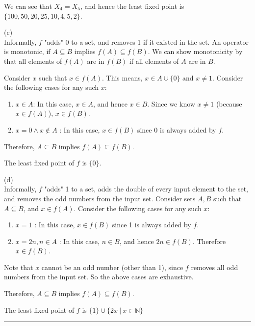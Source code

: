 \documentclass[12pt,letterpaper, onecolumn]{exam}
\begin{document}
\begin{questions}
	We can see that $X_4 = X_5$, and hence the least fixed point is $ \{100, 50, 20, 25, 10, 4, 5, 2\} $.

	(c) \\
	Informally, $f$ "adds" 0 to a set, and removes 1 if it existed in the set.
	An operator is monotonic, if $A \subseteq B$ implies $f(A) \subseteq f(B)$.
	We can show monotonicity by that all elements of $f(A)$ are in $f(B)$ if all elements of $A$ are in $B$.

	Consider $x$ such that $x \in f(A)$. This means, $x \in A \cup \{0\}$ and $x \neq 1$.
	Consider the following cases for any such $x$:
	\begin{enumerate}
		\item $x \in A $: In this case, $x \in A$, and hence $x \in B$. Since we know $x \neq 1$ (because $x \in f(A)$), $x \in f(B)$.
		\item $x = 0 \land x \notin A$ : In this case, $x \in f(B)$ since 0 is always added by $f$.
	\end{enumerate}

	Therefore, $A \subseteq B$ implies $f(A) \subseteq f(B)$.

	The least fixed point of $f$ is $ \{0\} $. 

	(d) \\

	Informally, $f$ "adds" 1 to a set, adds the double of every input element to the set, and removes the odd numbers from the input set.
	Consider sets $A, B$ such that $A \subseteq B$, and $x \in f(A)$.
	Consider the following cases for any such $x$:
	\begin{enumerate}
		\item $x = 1$ : In this case, $x \in f(B)$ since 1 is always added by $f$.
		\item $x = 2n, n \in A$ : In this case, $n \in B$, and hence $2n \in f(B)$. Therefore $x \in f(B)$.
	\end{enumerate}
	Note that $x$ cannot be an odd number (other than 1), since $f$ removes all odd numbers from the input set.
	So the above cases are exhaustive.

	Therefore, $A \subseteq B$ implies $f(A) \subseteq f(B)$.

	The least fixed point of $f$ is $\{1\} \cup \{2x \: | \: x \in \mathbb{N}\}$


    {\rule{17cm}{0.4pt}}


\end{questions}
\end{document}

